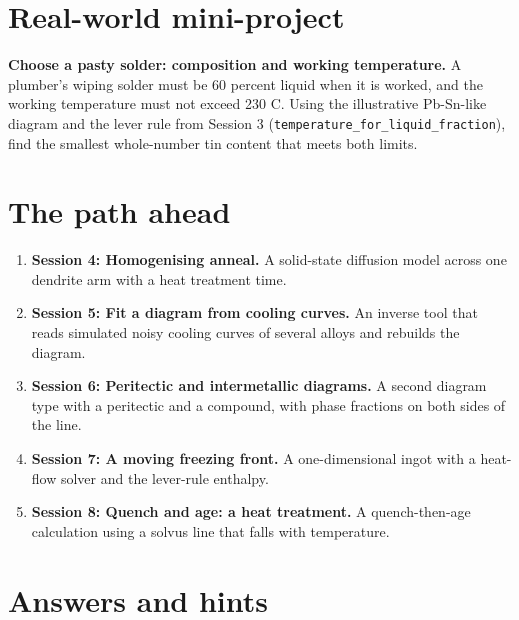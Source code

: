 \documentclass[11pt,a4paper]{article}
\begin{document}
\section{Real-world mini-project}
\textbf{Choose a pasty solder: composition and working temperature.} A plumber's wiping solder must be 60 percent liquid when it is worked, and the working temperature must not exceed 230 C. Using the illustrative Pb-Sn-like diagram and the lever rule from Session 3 (\texttt{temperature\_for\_liquid\_fraction}), find the smallest whole-number tin content that meets both limits.

\section{The path ahead}
\begin{enumerate}[nosep]
\item \textbf{Session 4: Homogenising anneal.} A solid-state diffusion model across one dendrite arm with a heat treatment time.
\item \textbf{Session 5: Fit a diagram from cooling curves.} An inverse tool that reads simulated noisy cooling curves of several alloys and rebuilds the diagram.
\item \textbf{Session 6: Peritectic and intermetallic diagrams.} A second diagram type with a peritectic and a compound, with phase fractions on both sides of the line.
\item \textbf{Session 7: A moving freezing front.} A one-dimensional ingot with a heat-flow solver and the lever-rule enthalpy.
\item \textbf{Session 8: Quench and age: a heat treatment.} A quench-then-age calculation using a solvus line that falls with temperature.
\end{enumerate}

\section{Answers and hints}
\end{document}
